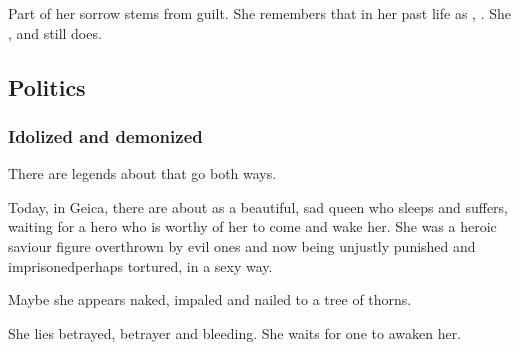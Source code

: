 Part of her sorrow stems from guilt. 
She remembers that in her past life as \Delphine, .
She , and still does. 









\subsection{Politics}





\subsubsection{Idolized and demonized}
There are legends about \Belzir that go both ways. 

Today, in Geica, there are  about \Belzir{} as a beautiful, sad queen who sleeps and suffers, waiting for a hero who is worthy of her to come and wake her. She was a heroic saviour figure overthrown by evil ones and now being unjustly punished and imprisoned\dash perhaps tortured, in a sexy way. 

Maybe she appears naked, impaled and nailed to a tree of thorns. 



She lies betrayed, betrayer and bleeding. 
She waits for one to awaken her. 

